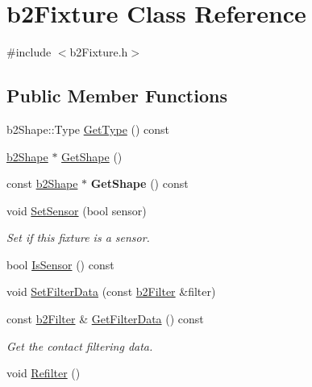 \hypertarget{classb2_fixture}{\section{b2\-Fixture Class Reference}
\label{classb2_fixture}
}


{\ttfamily \#include $<$b2\-Fixture.\-h$>$}

\subsection*{Public Member Functions}
\begin{DoxyCompactItemize}
\item 
b2\-Shape\-::\-Type \hyperlink{classb2_fixture_ab0e1d6bc1c42e6f779e77db408ab2d24}{Get\-Type} () const 
\item 
\hyperlink{classb2_shape}{b2\-Shape} $\ast$ \hyperlink{classb2_fixture_aaa2b73fa212fa53b1c800cccd7a1d31e}{Get\-Shape} ()
\item 
\hypertarget{classb2_fixture_a5ede102030bd041b07fec5c1f082c8c9}{const \hyperlink{classb2_shape}{b2\-Shape} $\ast$ {\bfseries Get\-Shape} () const }\label{classb2_fixture_a5ede102030bd041b07fec5c1f082c8c9}

\item 
\hypertarget{classb2_fixture_a6198a81dcee0fe814d730383ebfa7038}{void \hyperlink{classb2_fixture_a6198a81dcee0fe814d730383ebfa7038}{Set\-Sensor} (bool sensor)}\label{classb2_fixture_a6198a81dcee0fe814d730383ebfa7038}

\begin{DoxyCompactList}\small\item\em Set if this fixture is a sensor. \end{DoxyCompactList}\item 
bool \hyperlink{classb2_fixture_a91758c9dca818ca45f3f6427c7e3fc19}{Is\-Sensor} () const 
\item 
void \hyperlink{classb2_fixture_a2c5e0d12c174927a4ad550459be334ad}{Set\-Filter\-Data} (const \hyperlink{structb2_filter}{b2\-Filter} \&filter)
\item 
\hypertarget{classb2_fixture_a5bc271a6e8082e727b053aead1ae86a9}{const \hyperlink{structb2_filter}{b2\-Filter} \& \hyperlink{classb2_fixture_a5bc271a6e8082e727b053aead1ae86a9}{Get\-Filter\-Data} () const }\label{classb2_fixture_a5bc271a6e8082e727b053aead1ae86a9}

\begin{DoxyCompactList}\small\item\em Get the contact filtering data. \end{DoxyCompactList}\item 
\hypertarget{classb2_fixture_a45d3320f94811d67383c48466165fa26}{void \hyperlink{classb2_fixture_a45d3320f94811d67383c48466165fa26}{Refilter} ()}\label{classb2_fixture_a45d3320f94811d67383c48466165fa26}


\end{DoxyCompactItemize}
